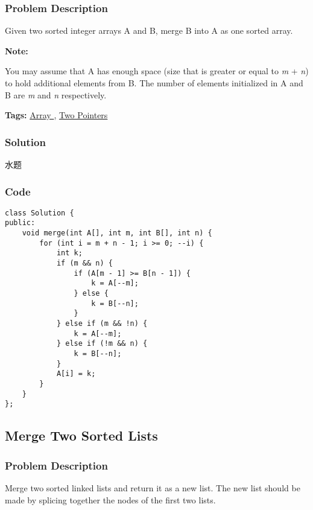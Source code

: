 \documentclass{article}
\begin{document}
\begin{CJK*}{UTF8}{gkai}
\subsubsection*{Problem Description}
Given two sorted integer arrays A and B, merge B into A as one sorted array.

\textbf{Note:}


You may assume that A has enough space (size that is greater or equal to \emph{m} + \emph{n}) to hold additional elements from B. The number of elements initialized in A and B are \emph{m} and \emph{n} respectively.


\textbf{Tags: }
\hyperref[ Array ]{ Array },  \hyperref[ Two Pointers ]{ Two Pointers }



\subsubsection*{Solution}
水题

\subsubsection*{Code}
\begin{lstlisting}
class Solution {
public:
    void merge(int A[], int m, int B[], int n) {
        for (int i = m + n - 1; i >= 0; --i) {
            int k;
            if (m && n) {
                if (A[m - 1] >= B[n - 1]) {
                    k = A[--m];
                } else {
                    k = B[--n];
                }
            } else if (m && !n) {
                k = A[--m];
            } else if (!m && n) {
                k = B[--n];
            }
            A[i] = k;
        }
    }
}; 
\end{lstlisting}


\subsection{ Merge Two Sorted Lists }
\label{ Merge Two Sorted Lists }

\subsubsection*{Problem Description}
Merge two sorted linked lists and return it as a new list. The new list should be made by splicing together the nodes of the first two lists.



\end{CJK*}
\end{document}
